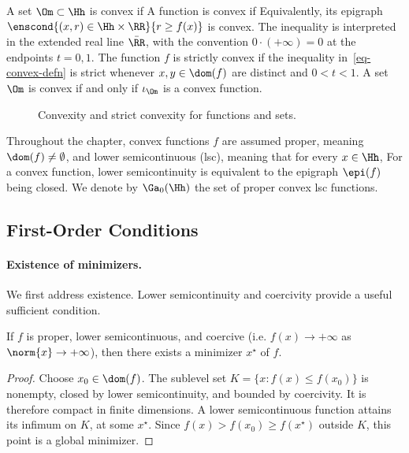A set $\Om \subset \Hh$ is convex if
A function is convex if
Equivalently, its epigraph $\enscond{(x,r) \in \Hh \times \RR}{r \geq f(x)}$ is convex. The inequality is interpreted in the extended real line $\bar\RR$, with the convention $0\cdot(+\infty)=0$ at the endpoints $t=0,1$.
%
The function $f$ is strictly convex if the inequality in~\eqref{eq-convex-defn} is strict whenever $x,y\in\dom(f)$ are distinct and $0<t<1$.
%
A set $\Om$ is convex if and only if $\iota_{\Om}$ is a convex function.



\begin{figure}[tbp]
\centering
{}
\caption{Convexity and strict convexity for functions and sets.}
\label{fig-convex-examples}
\end{figure}




Throughout the chapter, convex functions $f$ are assumed proper, meaning $\dom(f) \neq \emptyset$, and lower semicontinuous (lsc), meaning that for every $x \in \Hh$,
For a convex function, lower semicontinuity is equivalent to the epigraph $\epi(f)$ being closed.
%
We denote by $\Ga_0(\Hh)$ the set of proper convex lsc functions.

\subsection{First-Order Conditions}

\paragraph{Existence of minimizers.}

We first address existence. Lower semicontinuity and coercivity provide a useful sufficient condition.

\begin{prop}
	If $f$ is proper, lower semicontinuous, and coercive (i.e. $f(x)\rightarrow +\infty$ as $\norm{x}\rightarrow +\infty$), then there exists a minimizer $x^\star$ of $f$.
\end{prop}

\begin{proof}
Choose $x_0\in\dom(f)$. The sublevel set $K=\{x:f(x)\leq f(x_0)\}$ is nonempty, closed by lower semicontinuity, and bounded by coercivity. It is therefore compact in finite dimensions. A lower semicontinuous function attains its infimum on $K$, at some $x^\star$. Since $f(x)>f(x_0)\geq f(x^\star)$ outside $K$, this point is a global minimizer.
\end{proof}

